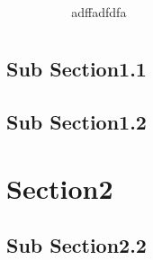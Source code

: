 \documentclass{mycv}
\begin{document}

 \\
{\color{magenta!80}\faMobile}\ \mobile
\ \ \ \faEnvelope\ \email
\ \ \  \faLinkedin\ adffadfdfa
\ \ \  \faGithub\ \github
\section{\name}
\subsection{Sub Section1.1}
\subsection{Sub Section1.2}
\section{Section2}
\subsection{Sub Section2.2}
\lipsum[1]

\ttfamily\scshape\lipsum[2]

\textcolor{red}{\ttfamily\scshape\lipsum[2]}
\end{document}
